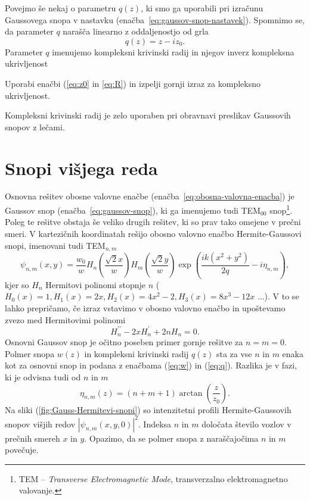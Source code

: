 Povejmo še nekaj o parametru $q(z)$, ki smo ga uporabili pri izračunu Gaussovega snopa v nastavku
(enačba~\ref{eq:gaussov-snop-nastavek}). Spomnimo 
se, da parameter $q$ narašča linearno z oddaljenostjo od grla
\begin{equation}
q(z) = z -iz_0.
\label{eq:q}
\end{equation}
Parameter $q$ imenujemo kompleksni krivinski radij in
njegov inverz kompleksna ukrivljenost
\begin{definition}
Uporabi enačbi (\ref{eq:z0} in \ref{eq:R}) in izpelji gornji izraz za kompleksno ukrivljenost.
\end{definition}
Kompleksni krivinski radij je zelo uporaben pri obravnavi preslikav Gaussovih snopov z lečami.

\section{Snopi višjega reda}
Osnovna rešitev obosne valovne enačbe (enačba~\ref{eq:obosna-valovna-enacba}) 
je Gaussov snop (enačba~\ref{eq:gaussov-snop}), ki ga imenujemo tudi TEM$_{00}$ 
snop\footnote{TEM -- {\it Transverse Electromagnetic Mode}, 
transverzalno elektromagnetno valovanje.}. 
Poleg te rešitve obstaja še veliko drugih rešitev, ki so prav tako omejene v prečni smeri. 
V kartezičnih koordinatah rešijo obosno valovno enačbo
Hermite-Gaussovi snopi, imenovani tudi TEM$_{n,m}$
\begin{equation}
\psi_{n,m}(x,y)=\frac{w_{0}}{w}H_{n}\left(\frac{\sqrt{2}x}{w}\right)H_{m}\left(\frac{\sqrt{2}y}{w}\right)
\exp\left(\frac{ik(x^{2}+y^{2})}{2q}-i\eta_{n,m}\right),
\label{eq:Gauss-Hermitevi}
\end{equation}
kjer so $H_{n}$ Hermitovi polinomi stopnje $n$ ($H_0(x)=1, H_1(x)=2x, H_2(x)=4x^2-2, H_3(x)=8x^3-12x$ ...). 
V to se lahko
prepričamo, če izraz vstavimo v obosno valovno enačbo
in upoštevamo zvezo med Hermitovimi polinomi 
\begin{equation}
H_{n}^{\prime\prime}-2xH_{n}^{\prime}+2nH_{n}=0.
\end{equation}
Osnovni Gaussov snop je očitno poseben primer gornje rešitve za $n=m=0$.
Polmer snopa $w(z)$ in kompleksni krivinski radij $q(z)$ sta za
vse $n$ in $m$ enaka kot za osnovni snop in podana z enačbama (\ref{eq:w})
in (\ref{eq:q}). Razlika je v fazi, ki je odvisna tudi od $n$ in $m$
\begin{equation}
\eta_{n,m}\left(z\right)=(n+m+1)\arctan\left(\frac{z}{z_{0}}\right).
\end{equation}
Na sliki (\ref{fig:Gauss-Hermitevi-snopi}) so intenzitetni profili 
Hermite-Gaussovih snopov višjih redov $|\psi_{n,m}(x, y, 0)|^2$.
Indeksa $n$ in $m$ določata število vozlov v prečnih smereh $x$ in $y$. Opazimo, da se polmer snopa z 
naraščajočima $n$ in $m$ povečuje.

